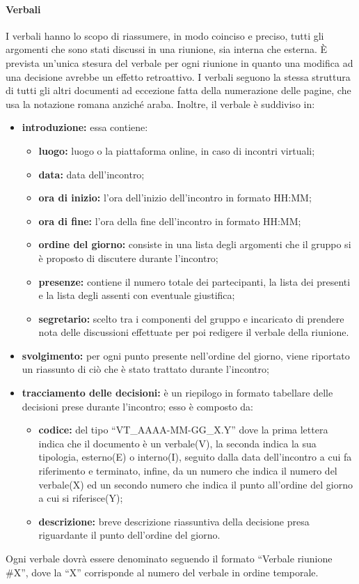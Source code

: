 			\paragraph{Verbali}
				I verbali hanno lo scopo di riassumere, in modo coinciso e preciso, tutti gli argomenti che sono stati discussi in una riunione, sia interna che esterna. È prevista un'unica stesura del verbale per ogni riunione in quanto una modifica ad una decisione avrebbe un effetto retroattivo. I verbali seguono la stessa struttura di tutti gli altri documenti ad eccezione fatta della numerazione delle pagine, che usa la notazione romana anziché araba. Inoltre, il verbale è suddiviso in:
				\begin{itemize}
					\item \textbf{introduzione:} essa contiene:
						\begin{itemize}
							\item \textbf{luogo:} luogo o la piattaforma online, in caso di incontri virtuali;
							\item \textbf{data:} data dell'incontro;
							\item \textbf{ora di inizio:} l'ora dell'inizio dell'incontro in formato HH:MM;
							\item \textbf{ora di fine:} l'ora della fine dell'incontro in formato HH:MM;
							\item \textbf{ordine del giorno:} consiste in una lista degli argomenti che il gruppo si è proposto di discutere durante l'incontro;
							\item \textbf{presenze:} contiene il numero totale dei partecipanti, la lista dei presenti e la lista degli assenti con eventuale giustifica;
							\item \textbf{segretario: } scelto tra i componenti del gruppo e incaricato di prendere nota delle discussioni effettuate per poi redigere il verbale della riunione.
						\end{itemize}
					\item \textbf{svolgimento:} per ogni punto presente nell'ordine del giorno, viene riportato un riassunto di ciò che è stato trattato durante l'incontro;
					\item \textbf{tracciamento delle decisioni:} è un riepilogo in formato tabellare delle decisioni prese durante l'incontro; esso è composto da:
						\begin{itemize}
							\item \textbf{codice:} del tipo ``VT_AAAA-MM-GG_X.Y'' dove la prima lettera indica che il documento è un verbale(V), la seconda indica la sua tipologia, esterno(E) o interno(I), seguito dalla data dell'incontro a cui fa riferimento e terminato, infine, da un numero che indica il numero del verbale(X) ed un secondo numero che indica il punto all'ordine del giorno a cui si riferisce(Y);
							\item \textbf{descrizione:} breve descrizione riassuntiva della decisione presa riguardante il punto dell'ordine del giorno.
					\end{itemize}
				\end{itemize}
				Ogni verbale dovrà essere denominato seguendo il formato ``Verbale riunione \#X'', dove la ``X'' corrisponde al numero del verbale in ordine temporale.
